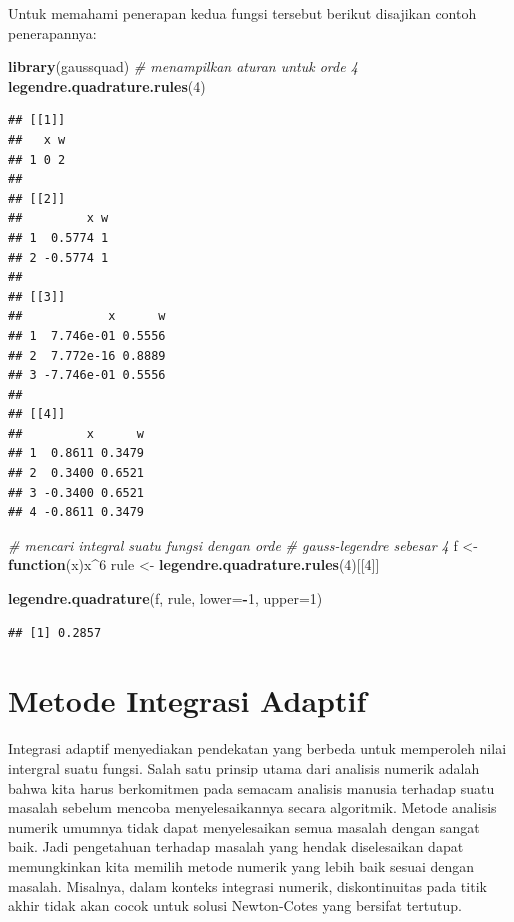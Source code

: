 \documentclass[]{book}
\newenvironment{Shaded}{\begin{snugshade}}{\end{snugshade}}
\newcommand{\CommentTok}[1]{\textcolor[rgb]{0.56,0.35,0.01}{\textit{#1}}}
\newcommand{\ControlFlowTok}[1]{\textcolor[rgb]{0.13,0.29,0.53}{\textbf{#1}}}
\newcommand{\DataTypeTok}[1]{\textcolor[rgb]{0.13,0.29,0.53}{#1}}
\newcommand{\DecValTok}[1]{\textcolor[rgb]{0.00,0.00,0.81}{#1}}
\newcommand{\KeywordTok}[1]{\textcolor[rgb]{0.13,0.29,0.53}{\textbf{#1}}}
\newcommand{\NormalTok}[1]{#1}
\newcommand{\OperatorTok}[1]{\textcolor[rgb]{0.81,0.36,0.00}{\textbf{#1}}}
\newcommand{\StringTok}[1]{\textcolor[rgb]{0.31,0.60,0.02}{#1}}
\theoremstyle{definition}
\theoremstyle{definition}
\theoremstyle{definition}
\theoremstyle{remark}
\begin{document}
Untuk memahami penerapan kedua fungsi tersebut berikut disajikan contoh penerapannya:

\begin{Shaded}
\begin{Highlighting}[]
\KeywordTok{library}\NormalTok{(gaussquad)}
\CommentTok{# menampilkan aturan untuk orde 4}
\KeywordTok{legendre.quadrature.rules}\NormalTok{(}\DecValTok{4}\NormalTok{)}
\end{Highlighting}
\end{Shaded}

\begin{verbatim}
## [[1]]
##   x w
## 1 0 2
## 
## [[2]]
##         x w
## 1  0.5774 1
## 2 -0.5774 1
## 
## [[3]]
##            x      w
## 1  7.746e-01 0.5556
## 2  7.772e-16 0.8889
## 3 -7.746e-01 0.5556
## 
## [[4]]
##         x      w
## 1  0.8611 0.3479
## 2  0.3400 0.6521
## 3 -0.3400 0.6521
## 4 -0.8611 0.3479
\end{verbatim}

\begin{Shaded}
\begin{Highlighting}[]
\CommentTok{# mencari integral suatu fungsi dengan orde}
\CommentTok{# gauss-legendre sebesar 4}
\NormalTok{f <-}\StringTok{ }\ControlFlowTok{function}\NormalTok{(x)x}\OperatorTok{^}\DecValTok{6}
\NormalTok{rule <-}\StringTok{ }\KeywordTok{legendre.quadrature.rules}\NormalTok{(}\DecValTok{4}\NormalTok{)[[}\DecValTok{4}\NormalTok{]]}

\KeywordTok{legendre.quadrature}\NormalTok{(f, rule, }\DataTypeTok{lower=}\OperatorTok{-}\DecValTok{1}\NormalTok{, }\DataTypeTok{upper=}\DecValTok{1}\NormalTok{)}
\end{Highlighting}
\end{Shaded}

\begin{verbatim}
## [1] 0.2857
\end{verbatim}

\hypertarget{adaptifint}{%
\section{Metode Integrasi Adaptif}\label{adaptifint}}

Integrasi adaptif menyediakan pendekatan yang berbeda untuk memperoleh nilai intergral suatu fungsi. Salah satu prinsip utama dari analisis numerik adalah bahwa kita harus berkomitmen pada semacam analisis manusia terhadap suatu masalah sebelum mencoba menyelesaikannya secara algoritmik. Metode analisis numerik umumnya tidak dapat menyelesaikan semua masalah dengan sangat baik. Jadi pengetahuan terhadap masalah yang hendak diselesaikan dapat memungkinkan kita memilih metode numerik yang lebih baik sesuai dengan masalah. Misalnya, dalam konteks integrasi numerik, diskontinuitas pada titik akhir tidak akan cocok untuk solusi Newton-Cotes yang bersifat tertutup.
\end{document}
